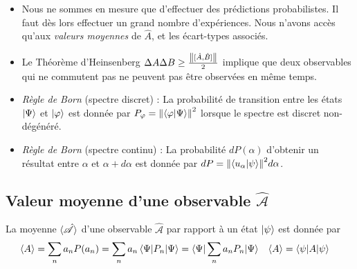 \documentclass[../notesdecours.tex]{subfiles}
\begin{document}
\begin{center}
\end{center}
\begin{itemize}
\item Nous ne sommes en mesure que d'effectuer des prédictions probabilistes. Il faut dès lors effectuer un grand nombre d'expériences. Nous n'avons accès qu'aux \emph{valeurs moyennes} de $\hat{A}$, et les écart-types associés.
\item Le Théorème d'Heinsenberg $\Delta A\Delta B \geq \frac{\norm{{[\hat{A},\hat{B}]}}}{2}$ implique que deux observables qui ne commutent pas ne peuvent pas être observées en même temps.
\item \textit{Règle de Born} (spectre discret) : La probabilité de transition entre les états $\ket{\Psi}$ et $\ket{\varphi}$ est donnée par $P_\varphi = \norm{\braket{\varphi|\Psi}}^2$ lorsque le spectre est discret non-dégénéré.

\item \textit{Règle de Born} (spectre continu) : La probabilité $dP(\alpha)$ d'obtenir un résultat entre $\alpha$ et $\alpha+d\alpha$ est donnée par $dP = \norm{\braket{u_\alpha|\psi}}^2d\alpha$.
\end{itemize}

\subsection{Valeur moyenne d'une observable $\mathcal{\hat{A}}$}

\begin{definition}
	La moyenne $\braket{\hat{\mathcal{A}}}$ d'une observable $\mathcal{\hat{A}}$ par rapport à un état $\ket{\psi}$ est donnée par
	\begin{align}
		\braket{A} &= \sum_n a_n P(a_n) = \sum_n a_n \braket{\Psi|P_n|\Psi} = \braket{\Psi|\sum_n a_n P_n | \Psi} & \braket{A} &= \braket{\psi|A|\psi}
	\end{align}
\end{definition}
\end{document}
